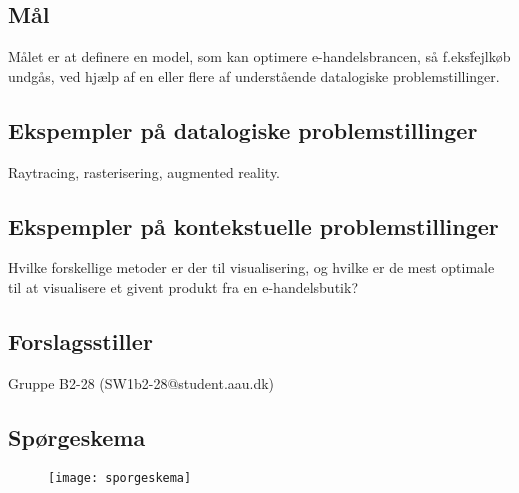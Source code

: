 \subsection*{Mål}
Målet er at definere en model, som kan optimere e-handelsbrancen, så f.eks\. fejlkøb undgås, ved hjælp af en eller flere af understående datalogiske problemstillinger.

\subsection*{Ekspempler på datalogiske problemstillinger}
Raytracing, rasterisering, augmented reality.

\subsection*{Ekspempler på kontekstuelle problemstillinger}
Hvilke forskellige metoder er der til visualisering, og hvilke er de mest optimale til at visualisere et givent produkt fra en e-handelsbutik?

\subsection*{Forslagsstiller}
Gruppe B2-28 (SW1b2-28@student.aau.dk)

\subsection*{Spørgeskema}
\label{sec:skema}
\begin{figure}[H]
    \texttt{[image: sporgeskema]}
\end{figure}